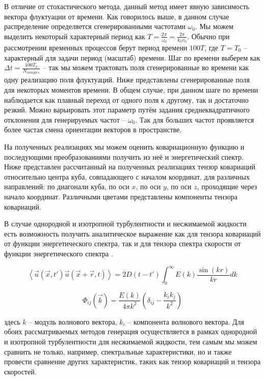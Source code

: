В отличие от стохастического метода, данный метод имеет явную зависимость вектора флуктуации от времени. Как говорилось выше, в данном случае распределение определяется сгенерированными частотами $\omega_0$. Мы можем выделить некоторый характерный период как $T = \frac{2 \pi}{\omega_0} = \frac{2 \pi}{k_0 v_0}$. Обычно при рассмотрении временных процессов берут период времени $100 T$, где $T = T_0$ -- характерный для задачи период (масштаб) времени. Шаг по времени выберем как $\Delta t = \frac{100 T_0}{N_{samples}}$ -- так мы можем трактовать поля сгенерированные во времени как одну реализацию поля флуктуаций. Ниже представлены сгенерированные поля для некоторых моментов времени. В общем случае, при данном шаге по времени наблюдается как плавный переход от одного поля к другому, так и достаточно резкий. Можно варьировать этот параметр путём задания среднеквадратичного отклонения для генерируемых частот -- $\omega_0$. Так для больших частот проявляется более частая смена ориентации векторов в пространстве.

%
%
%
%

На полученных реализациях мы можем оценить ковариационную функцию и последующими преобразованиями получить из неё и энергетический спектр. Ниже представлен рассчитанный на полученных реализациях тензор ковариаций относительно центра куба, совпадающего с началом координат, для различных направлений: по диагонали куба, по оси $x$, по оси $y$, по оси $z$, проходящие через начало координат. Различными цветами представлены компоненты тензора ковариаций. 

В случае однородной и изотропной турбулентности и несжимаемой жидкости есть возможность получить аналитическое выражение как для тензора ковариаций от функции энергетического спектра, так и для тензора спектра скорости от функции энергетического спектра \cite{Kraichnan70, pope2000turbulent}.

\begin{equation}
    \label{eq:part3_1}
    \left< \vec u (\vec x, t') \vec u (\vec x + \vec r, t) \right> = 2 D(t - t') \int_{0}^{\infty} E(k) \frac{\sin{(k r)}}{k r} dk 
\end{equation}

\begin{equation}
    \label{eq:part3_2}
    \Phi_{ij}(\vec k) = \frac{E(k)}{4 \pi k^2} \left( \delta_{ij} - \frac{k_i k_j}{k^2} \right)
\end{equation}

\noindent
здесь $k$ -- модуль волнового вектора, $k_i$ -- компонента волнового вектора.
Для обоих рассматриваемых методов генерация осуществляется в рамках однородной и изотропной турбулентности для несжимаемой жидкости, тем самым мы можем сравнить не только, например, спектральные характеристики, но и также провести сравнение других характеристик, таких как тензор ковариаций и тензора скоростей.

